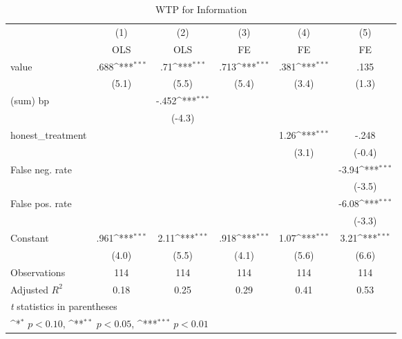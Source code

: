 \begin{table}[htbp]\centering
\def\sym#1{\ifmmode^{#1}\else\(^{#1}\)\fi}
\caption{WTP for Information}
\begin{tabular}{l*{5}{c}}
\hline\hline
                &\multicolumn{1}{c}{(1)}&\multicolumn{1}{c}{(2)}&\multicolumn{1}{c}{(3)}&\multicolumn{1}{c}{(4)}&\multicolumn{1}{c}{(5)}\\
                &\multicolumn{1}{c}{OLS}&\multicolumn{1}{c}{OLS}&\multicolumn{1}{c}{FE}&\multicolumn{1}{c}{FE}&\multicolumn{1}{c}{FE}\\
\hline
value           &     .688\sym{***}&      .71\sym{***}&     .713\sym{***}&     .381\sym{***}&     .135         \\
                &    (5.1)         &    (5.5)         &    (5.4)         &    (3.4)         &    (1.3)         \\
(sum) bp        &                  &    -.452\sym{***}&                  &                  &                  \\
                &                  &   (-4.3)         &                  &                  &                  \\
honest\_treatment&                  &                  &                  &     1.26\sym{***}&    -.248         \\
                &                  &                  &                  &    (3.1)         &   (-0.4)         \\
False neg. rate &                  &                  &                  &                  &    -3.94\sym{***}\\
                &                  &                  &                  &                  &   (-3.5)         \\
False pos. rate &                  &                  &                  &                  &    -6.08\sym{***}\\
                &                  &                  &                  &                  &   (-3.3)         \\
Constant        &     .961\sym{***}&     2.11\sym{***}&     .918\sym{***}&     1.07\sym{***}&     3.21\sym{***}\\
                &    (4.0)         &    (5.5)         &    (4.1)         &    (5.6)         &    (6.6)         \\
\hline
Observations    &      114         &      114         &      114         &      114         &      114         \\
Adjusted \(R^{2}\)&     0.18         &     0.25         &     0.29         &     0.41         &     0.53         \\
\hline\hline
\multicolumn{6}{l}{\footnotesize \textit{t} statistics in parentheses}\\
\multicolumn{6}{l}{\footnotesize \sym{*} \(p<0.10\), \sym{**} \(p<0.05\), \sym{***} \(p<0.01\)}\\
\end{tabular}
\end{table}

